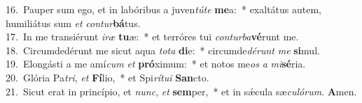 {16.~}Pauper sum ego, et in labóribus a juven\textit{tú}\textit{te} \textbf{me}a:~* exaltátus autem, humiliátus sum \textit{et} \textit{con}\textit{tur}\textbf{bá}tus.\\
{17.~}In me transiérunt \textit{i}\textit{ræ} \textbf{tu}æ:~* et terróres tui \textit{con}\textit{tur}\textit{ba}\textbf{vé}runt me.\\
{18.~}Circumdedérunt me sicut aqua \textit{to}\textit{ta} \textbf{di}e:~* circumde\textit{dé}\textit{runt} \textit{me} \textbf{si}mul.\\
{19.~}Elongásti a me amí\textit{cum} \textit{et} \textbf{pró}ximum:~* et notos me\textit{os} \textit{a} \textit{mi}\textbf{sé}ria.\\
{20.~}Glória Pa\textit{tri}, \textit{et} \textbf{Fí}lio,~* et Spi\textit{rí}\textit{tu}\textit{i} \textbf{San}cto.\\
{21.~}Sicut erat in princípio, et \textit{nunc}, \textit{et} \textbf{sem}per,~* et in sǽcula sæ\textit{cu}\textit{ló}\textit{rum}. \textbf{A}men.\\
